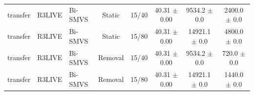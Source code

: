 \begin{table}[t]
\begin{tabular}{lllccccc}
transfer & R3LIVE & Bi-SMVS & Static & 15/40 & 40.31 $\pm$ 0.00 & 9534.2 $\pm$ 0.0 & 2400.0 $\pm$ 0.0 \\
transfer & R3LIVE & Bi-SMVS & Static & 15/80 & 40.31 $\pm$ 0.00 & 14921.1 $\pm$ 0.0 & 4800.0 $\pm$ 0.0 \\
transfer & R3LIVE & Bi-SMVS & Removal & 15/40 & 40.31 $\pm$ 0.00 & 9534.2 $\pm$ 0.0 & 720.0 $\pm$ 0.0 \\
transfer & R3LIVE & Bi-SMVS & Removal & 15/80 & 40.31 $\pm$ 0.00 & 14921.1 $\pm$ 0.0 & 1440.0 $\pm$ 0.0 \\
\hline
\end{tabular}
\end{table}
